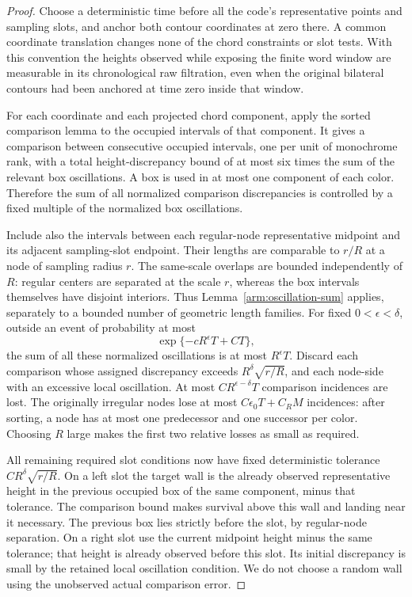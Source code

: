 \begin{proof}
Choose a deterministic time before all the code's representative
points and sampling slots, and anchor both contour coordinates at
zero there.  A common coordinate translation changes none of the
chord constraints or slot tests.  With this convention the heights
observed while exposing the finite word window are measurable in
its chronological raw filtration, even when the original bilateral
contours had been anchored at time zero inside that window.

For each coordinate and each projected chord component, apply the
sorted comparison lemma to the occupied intervals of that component.
It gives a comparison between consecutive occupied intervals, one per
unit of monochrome rank, with a total height-discrepancy bound of at
most six times the sum of the relevant box oscillations.  A box is
used in at most one component of each color.  Therefore the sum of
all normalized comparison discrepancies is controlled by a fixed
multiple of the normalized box oscillations.

Include also the intervals between each regular-node representative midpoint and
its adjacent sampling-slot endpoint.  Their lengths are comparable
to $r/R$ at a node of sampling radius $r$.  The same-scale overlaps
are bounded independently of $R$: regular centers are separated at
the scale $r$, whereas the box intervals themselves have disjoint
interiors.  Thus Lemma~\ref{arm:oscillation-sum} applies, separately
to a bounded number of geometric length families.  For fixed
$0<\epsilon<\delta$, outside an event of probability at most
\[
 \exp\{-cR^\epsilon T+CT\},
\]
the sum of all these normalized oscillations is at most $R^\epsilon T$.
Discard each comparison whose assigned discrepancy exceeds
$R^\delta\sqrt{r/R}$, and each node-side with an excessive local
oscillation.  At most $C R^{\epsilon-\delta}T$ comparison incidences
are lost.  The originally irregular nodes lose at most
$C\epsilon_0T+C_RM$ incidences: after sorting, a node has at most
one predecessor and one successor per color.  Choosing $R$ large
makes the first two relative losses as small as required.

All remaining required slot conditions now have fixed deterministic
tolerance $C R^\delta\sqrt{r/R}$.  On a left slot the target wall is
the already observed representative height in the previous occupied
box of the same component, minus that tolerance.  The comparison
bound makes survival above this wall and landing near it necessary.
The previous box lies strictly before the slot, by regular-node
separation.  On a right slot use the current midpoint height minus
the same tolerance; that height is already observed before this
slot.  Its initial discrepancy is small by the retained local
oscillation condition.  We do not choose a random wall using the
unobserved actual comparison error.


\end{proof}
